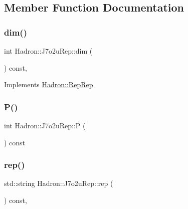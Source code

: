 \subsection{Member Function Documentation}
\mbox{\label{structHadron_1_1J7o2uRep_a3e4b64082feea60a18a0f73a6a8a17b2}} 
\subsubsection{\texorpdfstring{dim()}{dim()}}
{\footnotesize\ttfamily int Hadron\+::\+J7o2u\+Rep\+::dim (\begin{DoxyParamCaption}{ }\end{DoxyParamCaption}) const\hspace{0.3cm}{\ttfamily [inline]}, {\ttfamily [virtual]}}



Implements \mbox{\hyperlink{structHadron_1_1RepRep_a92c8802e5ed7afd7da43ccfd5b7cd92b}{Hadron\+::\+Rep\+Rep}}.

\mbox{\label{structHadron_1_1J7o2uRep_a88b8aa1e3c89050f1f0a901f0082b927}} 
\subsubsection{\texorpdfstring{P()}{P()}}
{\footnotesize\ttfamily int Hadron\+::\+J7o2u\+Rep\+::P (\begin{DoxyParamCaption}{ }\end{DoxyParamCaption}) const\hspace{0.3cm}{\ttfamily [inline]}}

\mbox{\label{structHadron_1_1J7o2uRep_a49421513b527a11bd45ec02e4ad3a042}} 
\subsubsection{\texorpdfstring{rep()}{rep()}}
{\footnotesize\ttfamily std\+::string Hadron\+::\+J7o2u\+Rep\+::rep (\begin{DoxyParamCaption}{ }\end{DoxyParamCaption}) const\hspace{0.3cm}{\ttfamily [inline]}, {\ttfamily [virtual]}}



